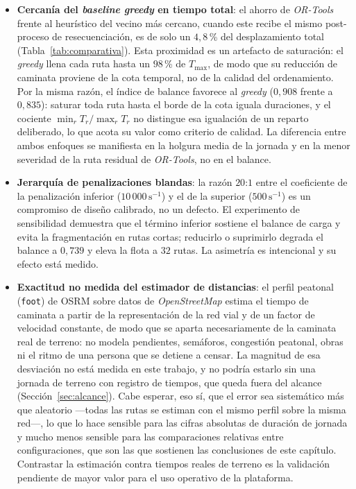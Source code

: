\begin{itemize}
  \item \textbf{Cercanía del \textit{baseline greedy} en tiempo total}: el ahorro de
  \textit{OR-Tools} frente al heurístico del vecino más cercano, cuando este recibe el
  mismo post-proceso de resecuenciación, es de solo un $4{,}8$\,\% del desplazamiento
  total (Tabla~\ref{tab:comparativa}). Esta proximidad es un artefacto de saturación: el
  \textit{greedy} llena cada ruta hasta un $98$\,\% de $T_{\max}$, de modo que su
  reducción de caminata proviene de la cota temporal, no de la calidad del ordenamiento.
  Por la misma razón, el índice de balance favorece al \textit{greedy} ($0{,}908$ frente
  a $0{,}835$): saturar toda ruta hasta el borde de la cota iguala duraciones, y el
  cociente $\min_r T_r / \max_r T_r$ no distingue esa igualación de un reparto
  deliberado, lo que acota su valor como criterio de calidad. La diferencia entre ambos
  enfoques se manifiesta en la holgura media de la jornada y en la menor severidad de la
  ruta residual de \textit{OR-Tools}, no en el balance.

  \item \textbf{Jerarquía de penalizaciones blandas}: la razón $20\mathord{:}1$ entre el
  coeficiente de la penalización inferior ($10\,000\,\text{s}^{-1}$) y el de la superior
  ($500\,\text{s}^{-1}$) es un compromiso de diseño calibrado, no un defecto. El
  experimento de sensibilidad demuestra que el término inferior sostiene el balance de
  carga y evita la fragmentación en rutas cortas; reducirlo o suprimirlo degrada el
  balance a $0{,}739$ y eleva la flota a $32$ rutas. La asimetría es intencional y su
  efecto está medido.

  \item \textbf{Exactitud no medida del estimador de distancias}: el perfil peatonal
  (\texttt{foot}) de OSRM sobre datos de \textit{OpenStreetMap} estima el tiempo de
  caminata a partir de la representación de la red vial y de un factor de velocidad
  constante, de modo que se aparta necesariamente de la caminata real de terreno: no
  modela pendientes, semáforos, congestión peatonal, obras ni el ritmo de una persona
  que se detiene a censar. La magnitud de esa desviación no está medida en
  este trabajo, y no podría estarlo sin una jornada de terreno con registro de tiempos,
  que queda fuera del alcance (Sección~\ref{sec:alcance}). Cabe esperar, eso sí, que el
  error sea sistemático más que aleatorio ---todas las rutas se estiman con el mismo
  perfil sobre la misma red---, lo que lo hace sensible para las cifras absolutas de
  duración de jornada y mucho menos sensible para las comparaciones relativas entre
  configuraciones, que son las que sostienen las conclusiones de este capítulo.
  Contrastar la estimación contra tiempos reales de terreno es la validación pendiente
  de mayor valor para el uso operativo de la plataforma.
\end{itemize}

